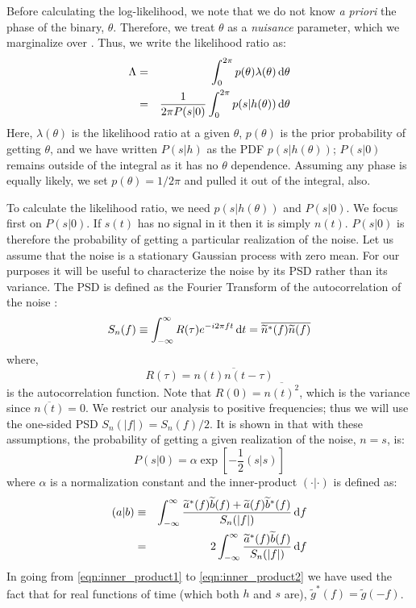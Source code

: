 Before calculating the log-likelihood, we note that we do not know \emph{a priori} the phase of the binary, $\theta$. Therefore, we treat $\theta$ as a \emph{nuisance} parameter, which we marginalize over \cite{Sivia:DataAnalysis:2E}. Thus, we write the likelihood ratio as:
\begin{eqnarray}
\Lambda & = & \int_0^{2 \pi} p(\theta) \lambda(\theta) \,\mathrm{d}\theta \nonumber \\
 & = & \frac{1}{2\pi P(s|0)} \int_0^{2 \pi} p(s|h(\theta)) \,\mathrm{d}\theta
\end{eqnarray}
Here, $\lambda(\theta)$ is the likelihood ratio at a given $\theta$, $p(\theta)$ is the prior probability of getting $\theta$, and we have written $P(s|h)$ as the \ac{PDF} $p(s|h(\theta))$; $P(s|0)$ remains outside of the integral as it has no $\theta$ dependence. Assuming any phase is equally likely, we set $p(\theta) = 1/2\pi$ and pulled it out of the integral, also.

To calculate the likelihood ratio, we need $p(s|h(\theta))$ and $P(s|0)$. We focus first on $P(s|0)$. If $s(t)$ has no signal in it then it is simply $n(t)$. $P(s|0)$ is therefore the probability of getting a particular realization of the noise. Let us assume that the noise is a stationary Gaussian process with zero mean. For our purposes it will be useful to characterize the noise by its \ac{PSD} rather than its variance. The \ac{PSD} is defined as the Fourier Transform of the autocorrelation of the noise \cite{wainstein:1962}:
\begin{equation}
S_n(f) \equiv \int_{-\infty}^{\infty} R(\tau)e^{-i 2\pi ft} \,\mathrm{d} t = \overline{\widetilde{n}^{*}(f)\widetilde{n}(f)}
\end{equation}
where,
\begin{equation}
R(\tau) = \overline{n(t)n(t-\tau)}
\end{equation}
is the autocorrelation function. Note that $R(0) = \overline{n(t)^2}$, which is the variance since $\overline{n(t)} = 0$. We restrict our analysis to positive frequencies; thus we will use the one-sided \ac{PSD} $S_n(|f|) = S_n(f)/2$. It is shown in \cite{Finn1992} that with these assumptions, the probability of getting a given realization of the noise, $n = s$, is:
\begin{equation}
\label{eqn:p_no_sig}
P(s|0) = \alpha \exp[ - \frac{1}{2} (s|s) ]
\end{equation}
where $\alpha$ is a normalization constant and the inner-product $(\cdot|\cdot)$ is defined as:
\begin{eqnarray}
\label{eqn:inner_product1}
(a|b) & \equiv & \int_{-\infty}^{\infty} \frac{ \widetilde{a}^{*}(f)\widetilde{b}(f) + \widetilde{a}(f)\widetilde{b}^{*}(f) }{S_n(|f|)} \d f \\
\label{eqn:inner_product2}
 & = & 2 \int_{-\infty}^{\infty} \frac{ \widetilde{a}^{*}(f)\widetilde{b}(f) }{S_n(|f|)} \d f
\end{eqnarray}
In going from \ref{eqn:inner_product1} to \ref{eqn:inner_product2} we have used the fact that for real functions of time (which both $h$ and $s$ are), $\widetilde{g}^{*}(f) = \widetilde{g}(-f)$.

